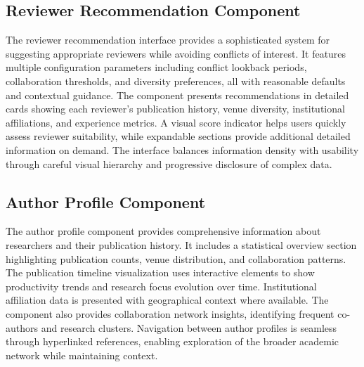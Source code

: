 \subsection{Reviewer Recommendation Component}
The reviewer recommendation interface provides a sophisticated system for suggesting appropriate reviewers while avoiding conflicts of interest. It features multiple configuration parameters including conflict lookback periods, collaboration thresholds, and diversity preferences, all with reasonable defaults and contextual guidance. The component presents recommendations in detailed cards showing each reviewer's publication history, venue diversity, institutional affiliations, and experience metrics. A visual score indicator helps users quickly assess reviewer suitability, while expandable sections provide additional detailed information on demand. The interface balances information density with usability through careful visual hierarchy and progressive disclosure of complex data.

\subsection{Author Profile Component}
The author profile component provides comprehensive information about researchers and their publication history. It includes a statistical overview section highlighting publication counts, venue distribution, and collaboration patterns. The publication timeline visualization uses interactive elements to show productivity trends and research focus evolution over time. Institutional affiliation data is presented with geographical context where available. The component also provides collaboration network insights, identifying frequent co-authors and research clusters. Navigation between author profiles is seamless through hyperlinked references, enabling exploration of the broader academic network while maintaining context.